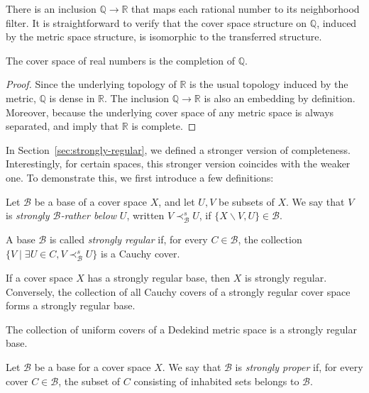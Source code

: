 \documentclass[reqno]{amsart}
\theoremstyle{definition}
\theoremstyle{remark}
\numberwithin{figure}{section}
\newcommand{\rb}{\prec}
\begin{document}
There is an inclusion $\mathbb{Q} \to \mathbb{R}$ that maps each rational number to its neighborhood filter.
It is straightforward to verify that the cover space structure on $\mathbb{Q}$, induced by the metric space structure, is isomorphic to the transferred structure.

\begin{prop}
The cover space of real numbers is the completion of $\mathbb{Q}$.
\end{prop}
\begin{proof}
Since the underlying topology of $\mathbb{R}$ is the usual topology induced by the metric, $\mathbb{Q}$ is dense in $\mathbb{R}$.
The inclusion $\mathbb{Q} \to \mathbb{R}$ is also an embedding by definition.
Moreover, because the underlying cover space of any metric space is always separated,  and  imply that $\mathbb{R}$ is complete.
\end{proof}

In Section~\ref{sec:strongly-regular}, we defined a stronger version of completeness.
Interestingly, for certain spaces, this stronger version coincides with the weaker one.
To demonstrate this, we first introduce a few definitions:

\begin{defn}
Let $\mathcal{B}$ be a base of a cover space $X$, and let $U,V$ be subsets of $X$.
We say that $V$ is \emph{strongly $\mathcal{B}$-rather below} $U$, written $V \rb^s_\mathcal{B} U$, if $\{ X \backslash V, U \} \in \mathcal{B}$.

A base $\mathcal{B}$ is called \emph{strongly regular} if, for every $C \in \mathcal{B}$,
the collection $\{ V \mid \exists U \in C, V \rb^s_\mathcal{B} U \}$ is a Cauchy cover.
\end{defn}

\begin{remark}
If a cover space $X$ has a strongly regular base, then $X$ is strongly regular.
Conversely, the collection of all Cauchy covers of a strongly regular cover space forms a strongly regular base.
\end{remark}

\begin{example}
The collection of uniform covers of a Dedekind metric space is a strongly regular base.
\end{example}

\begin{defn}
Let $\mathcal{B}$ be a base for a cover space $X$.
We say that $\mathcal{B}$ is \emph{strongly proper} if, for every cover $C \in \mathcal{B}$, the subset of $C$ consisting of inhabited sets belongs to $\mathcal{B}$.
\end{defn}
\end{document}
